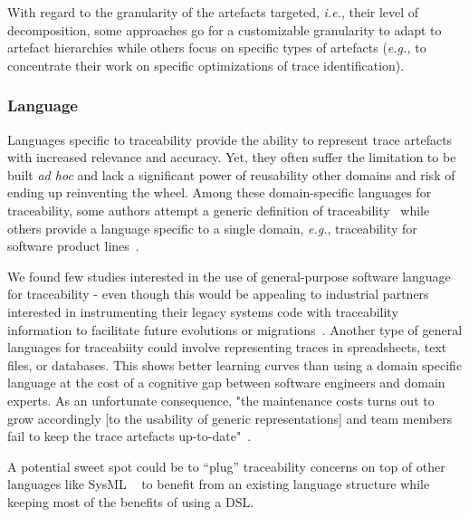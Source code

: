 With regard to the granularity of the artefacts targeted, \textit{i.e.}, their level of decomposition, some approaches go for a customizable granularity to adapt to artefact hierarchies while others  focus on specific types of artefacts (\textit{e.g.,} to concentrate their work on specific optimizations of trace identification).

\subsubsection{Language} 
Languages specific to traceability provide the ability to represent trace artefacts with increased relevance and accuracy. Yet, they often suffer the limitation to be built \textit{ad hoc} and lack a significant power of reusability other domains and risk of ending up reinventing the wheel. Among these domain-specific languages for traceability, some authors attempt a generic definition of traceability~\cite{heisig2019-generic-traceability-metamodel-end-to-end-capra,azevedo2019-traceability-metamodel-and-reference-model} while others provide a language specific to a single domain, \textit{e.g.}, traceability for software product lines~\cite{anquetil2010-model-driven-tracea-for-SPL}.

We found few studies interested in the use of general-purpose software language for traceability - even though this would be appealing to industrial partners interested in instrumenting their legacy systems code with traceability information to facilitate future evolutions or migrations~\cite{nejat2012-traceability-sysml-safety-certification}. 
Another type of general languages for traceabiity could involve representing traces in spreadsheets, text files, or databases. This shows better learning curves than using a domain specific language at the cost of a cognitive gap between software engineers and domain experts. As an unfortunate consequence, "the maintenance costs turns out to grow accordingly [to the usability of generic representations] and team members fail to keep the trace artefacts up-to-date"~\cite{clelandhuang2007bestPracticeForAutomatedTraceability}.

A potential sweet spot could be to ``plug'' traceability concerns on top of other languages like SysML ~\cite{nejat2012-traceability-sysml-safety-certification} to benefit from an existing language structure while keeping most of the benefits of using a DSL. 

